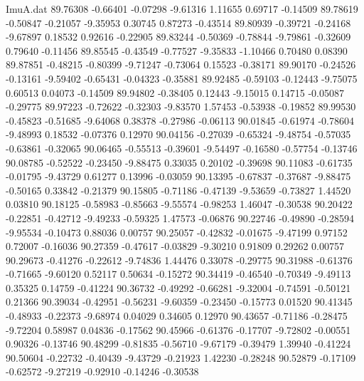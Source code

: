 \begin{filecontents}{ImuA.dat}
  89.76308   -0.66401   -0.07298   -9.61316    1.11655    0.69717   -0.14509
  89.78619   -0.50847   -0.21057   -9.35953    0.30745    0.87273   -0.43514
  89.80939   -0.39721   -0.24168   -9.67897    0.18532    0.92616   -0.22905
  89.83244   -0.50369   -0.78844   -9.79861   -0.32609    0.79640   -0.11456
  89.85545   -0.43549   -0.77527   -9.35833   -1.10466    0.70480    0.08390
  89.87851   -0.48215   -0.80399   -9.71247   -0.73064    0.15523   -0.38171
  89.90170   -0.24526   -0.13161   -9.59402   -0.65431   -0.04323   -0.35881
  89.92485   -0.59103   -0.12443   -9.75075    0.60513    0.04073   -0.14509
  89.94802   -0.38405    0.12443   -9.15015    0.14715   -0.05087   -0.29775
  89.97223   -0.72622   -0.32303   -9.83570    1.57453   -0.53938   -0.19852
  89.99530   -0.45823   -0.51685   -9.64068    0.38378   -0.27986   -0.06113
  90.01845   -0.61974   -0.78604   -9.48993    0.18532   -0.07376    0.12970
  90.04156   -0.27039   -0.65324   -9.48754   -0.57035   -0.63861   -0.32065
  90.06465   -0.55513   -0.39601   -9.54497   -0.16580   -0.57754   -0.13746
  90.08785   -0.52522   -0.23450   -9.88475    0.33035    0.20102   -0.39698
  90.11083   -0.61735   -0.01795   -9.43729    0.61277    0.13996   -0.03059
  90.13395   -0.67837   -0.37687   -9.88475   -0.50165    0.33842   -0.21379
  90.15805   -0.71186   -0.47139   -9.53659   -0.73827    1.44520    0.03810
  90.18125   -0.58983   -0.85663   -9.55574   -0.98253    1.46047   -0.30538
  90.20422   -0.22851   -0.42712   -9.49233   -0.59325    1.47573   -0.06876
  90.22746   -0.49890   -0.28594   -9.95534   -0.10473    0.88036    0.00757
  90.25057   -0.42832   -0.01675   -9.47199    0.97152    0.72007   -0.16036
  90.27359   -0.47617   -0.03829   -9.30210    0.91809    0.29262    0.00757
  90.29673   -0.41276   -0.22612   -9.74836    1.44476    0.33078   -0.29775
  90.31988   -0.61376   -0.71665   -9.60120    0.52117    0.50634   -0.15272
  90.34419   -0.46540   -0.70349   -9.49113    0.35325    0.14759   -0.41224
  90.36732   -0.49292   -0.66281   -9.32004   -0.74591   -0.50121    0.21366
  90.39034   -0.42951   -0.56231   -9.60359   -0.23450   -0.15773    0.01520
  90.41345   -0.48933   -0.22373   -9.68974    0.04029    0.34605    0.12970
  90.43657   -0.71186   -0.28475   -9.72204    0.58987    0.04836   -0.17562
  90.45966   -0.61376   -0.17707   -9.72802   -0.00551    0.90326   -0.13746
  90.48299   -0.81835   -0.56710   -9.67179   -0.39479    1.39940   -0.41224
  90.50604   -0.22732   -0.40439   -9.43729   -0.21923    1.42230   -0.28248
  90.52879   -0.17109   -0.62572   -9.27219   -0.92910   -0.14246   -0.30538

\end{filecontents}
